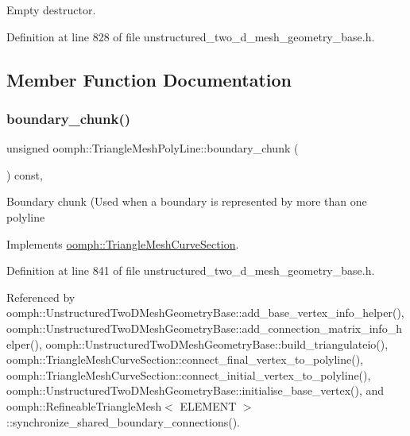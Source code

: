 Empty destructor. 



Definition at line 828 of file unstructured\+\_\+two\+\_\+d\+\_\+mesh\+\_\+geometry\+\_\+base.\+h.



\subsection{Member Function Documentation}
\mbox{\label{classoomph_1_1TriangleMeshPolyLine_a4535773043c6b9516b81df42468294c1}} 
\subsubsection{\texorpdfstring{boundary\+\_\+chunk()}{boundary\_chunk()}}
{\footnotesize\ttfamily unsigned oomph\+::\+Triangle\+Mesh\+Poly\+Line\+::boundary\+\_\+chunk (\begin{DoxyParamCaption}{ }\end{DoxyParamCaption}) const\hspace{0.3cm}{\ttfamily [inline]}, {\ttfamily [virtual]}}

Boundary chunk (Used when a boundary is represented by more than one polyline 

Implements \hyperlink{classoomph_1_1TriangleMeshCurveSection_a106d1f0e203e8e17c8296419be284c16}{oomph\+::\+Triangle\+Mesh\+Curve\+Section}.



Definition at line 841 of file unstructured\+\_\+two\+\_\+d\+\_\+mesh\+\_\+geometry\+\_\+base.\+h.



Referenced by oomph\+::\+Unstructured\+Two\+D\+Mesh\+Geometry\+Base\+::add\+\_\+base\+\_\+vertex\+\_\+info\+\_\+helper(), oomph\+::\+Unstructured\+Two\+D\+Mesh\+Geometry\+Base\+::add\+\_\+connection\+\_\+matrix\+\_\+info\+\_\+helper(), oomph\+::\+Unstructured\+Two\+D\+Mesh\+Geometry\+Base\+::build\+\_\+triangulateio(), oomph\+::\+Triangle\+Mesh\+Curve\+Section\+::connect\+\_\+final\+\_\+vertex\+\_\+to\+\_\+polyline(), oomph\+::\+Triangle\+Mesh\+Curve\+Section\+::connect\+\_\+initial\+\_\+vertex\+\_\+to\+\_\+polyline(), oomph\+::\+Unstructured\+Two\+D\+Mesh\+Geometry\+Base\+::initialise\+\_\+base\+\_\+vertex(), and oomph\+::\+Refineable\+Triangle\+Mesh$<$ E\+L\+E\+M\+E\+N\+T $>$\+::synchronize\+\_\+shared\+\_\+boundary\+\_\+connections().

